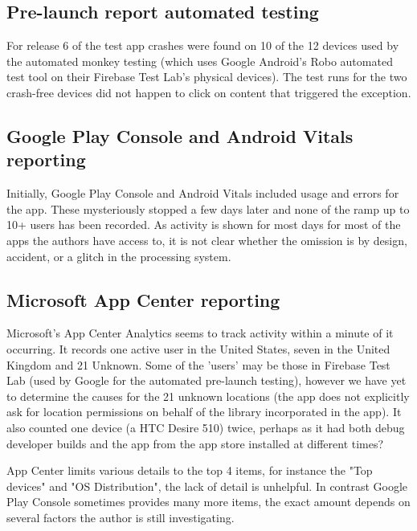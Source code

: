 \subsection{Pre-launch report automated testing}
For release 6 of the test app crashes were found on 10 of the 12 devices used by the automated monkey testing (which uses Google Android's Robo automated test tool on their Firebase Test Lab's physical devices). The test runs for the two crash-free devices did not happen to click on content that triggered the exception.

\subsection{Google Play Console and Android Vitals reporting}
Initially, Google Play Console and Android Vitals included usage and errors for the app. These mysteriously stopped a few days later and none of the ramp up to 10+ users has been recorded. As activity is shown for most days for most of the apps the authors have access to, it is not clear whether the omission is by design, accident, or a glitch in the processing system.

\subsection{Microsoft App Center reporting}
Microsoft's App Center Analytics seems to track activity within a minute of it occurring. It records one active user in the United States, seven in the United Kingdom and 21 Unknown. Some of the 'users' may be those in Firebase Test Lab (used by Google for the automated pre-launch testing), however we have yet to determine the causes for the 21 unknown locations (the app does not explicitly ask for location permissions on behalf of the  library incorporated in the app). It also counted one device (a HTC Desire 510) twice, perhaps as it had both debug developer builds and the app from the app store installed at different times?

App Center limits various details to the top 4 items, for instance the "Top devices" and "OS Distribution", the lack of detail is unhelpful. In contrast Google Play Console sometimes provides many more items, the exact amount depends on several factors the author is still investigating.

